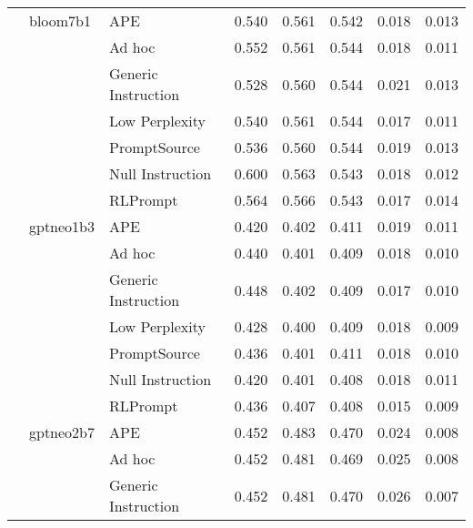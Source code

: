 \begin{supertabular}{lllrrrrr}
              & bloom7b1 & APE &            0.540 &           0.561 &          0.542 &        0.018 &    0.013 \\
              &        & Ad hoc &            0.552 &           0.561 &          0.544 &        0.018 &    0.011 \\
              &        & Generic Instruction &            0.528 &           0.560 &          0.544 &        0.021 &    0.013 \\
              &        & Low Perplexity &            0.540 &           0.561 &          0.544 &        0.017 &    0.011 \\
              &        & PromptSource &            0.536 &           0.560 &          0.544 &        0.019 &    0.013 \\
              &        & Null Instruction &            0.600 &           0.563 &          0.543 &        0.018 &    0.012 \\
              &        & RLPrompt &            0.564 &           0.566 &          0.543 &        0.017 &    0.014 \\
              & gptneo1b3 & APE &            0.420 &           0.402 &          0.411 &        0.019 &    0.011 \\
              &        & Ad hoc &            0.440 &           0.401 &          0.409 &        0.018 &    0.010 \\
              &        & Generic Instruction &            0.448 &           0.402 &          0.409 &        0.017 &    0.010 \\
              &        & Low Perplexity &            0.428 &           0.400 &          0.409 &        0.018 &    0.009 \\
              &        & PromptSource &            0.436 &           0.401 &          0.411 &        0.018 &    0.010 \\
              &        & Null Instruction &            0.420 &           0.401 &          0.408 &        0.018 &    0.011 \\
              &        & RLPrompt &            0.436 &           0.407 &          0.408 &        0.015 &    0.009 \\
              & gptneo2b7 & APE &            0.452 &           0.483 &          0.470 &        0.024 &    0.008 \\
              &        & Ad hoc &            0.452 &           0.481 &          0.469 &        0.025 &    0.008 \\
              &        & Generic Instruction &            0.452 &           0.481 &          0.470 &        0.026 &    0.007 \\

\end{supertabular}
